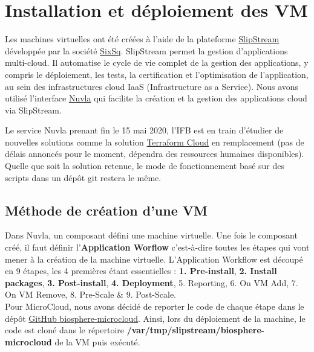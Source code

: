 \section {Installation et déploiement des VM}
Les machines virtuelles ont été créées à l'aide de la plateforme \href{https://github.com/slipstream/SlipStream}{SlipStream} développée par la société \href {https://sixsq.com/}{SixSq}. SlipStream permet la gestion d'applications multi-cloud. Il automatise le cycle de vie complet de la gestion des applications, y compris le déploiement, les tests, la certification et l'optimisation de l'application, au sein des infrastructures cloud IaaS (Infrastructure as a Service). Nous avons utilisé l'interface \href {https://docs.nuvla.io/nuvla}{Nuvla} qui facilite la création et la gestion des applications cloud via SlipStream.
\newline

Le service Nuvla prenant fin le 15 mai 2020, l'IFB est en train d'étudier de nouvelles solutions comme la solution \href {https://www.hashicorp.com/blog/announcing-terraform-cloud/}{Terraform Cloud} en remplacement (pas de délais annoncés pour le moment, dépendra des ressources humaines disponibles). Quelle que soit la solution retenue, le mode de fonctionnement basé sur des scripts dans un dépôt git restera le même.

\subsection{Méthode de création d'une VM}

Dans Nuvla, un composant défini une machine virtuelle. Une fois le composant créé, il faut définir l'\textbf{Application Worflow} c'est-à-dire toutes les étapes qui vont mener à la création de la machine virtuelle.
L'Application Workflow est découpé en 9 étapes, les 4 premières étant essentielles : \textbf{1. Pre-install}, \textbf{2. Install packages}, \textbf{3. Post-install}, \textbf{4. Deployment}, 5. Reporting, 6. On VM Add, 7. On VM Remove, 8. Pre-Scale \& 9. Post-Scale.\\

Pour MicroCloud, nous avons décidé de reporter le code de chaque étape dans le dépôt \href{https://github.com/IFB-ElixirFr/biosphere-microcloud}{GitHub biosphere-microcloud}. Ainsi, lors du déploiement de la machine, le code est cloné dans le répertoire \textbf{/var/tmp/slipstream/biosphere-microcloud} de la VM puis exécuté.
\newline

